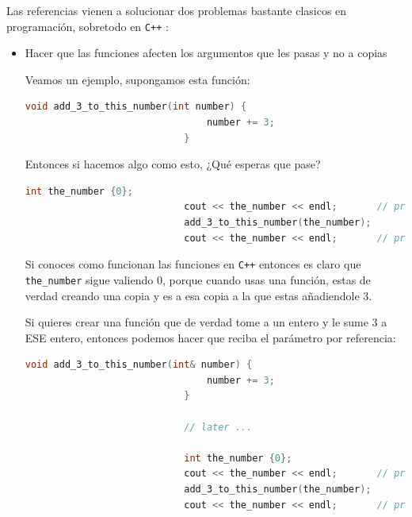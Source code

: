 \documentclass[12pt, fleqn]{report}                             %
\theoremstyle{break}                                            %
\newcommand{\textCode}[1]  { \texttt{#1} }                      %
\newcommand \Cpp  {\textCode{C++} }                               %
\begin{document}
                Las referencias vienen a solucionar dos problemas bastante clasicos en programación, 
                sobretodo en \Cpp:
                \begin{itemize}
                    \item Hacer que las funciones afecten los argumentos que les pasas y no a copias
                        
                        Veamos un ejemplo, supongamos esta función:
                        \begin{lstlisting}[language=C++, gobble=28]
                            void add_3_to_this_number(int number) {
                                number += 3;
                            }
                        \end{lstlisting}

                        Entonces si hacemos algo como esto, ¿Qué esperas que pase?
                        \begin{lstlisting}[language=C++, gobble=28]
                            int the_number {0};
                            cout << the_number << endl;       // prints 0
                            add_3_to_this_number(the_number);
                            cout << the_number << endl;       // prints 0 :c
                        \end{lstlisting}

                        Si conoces como funcionan las funciones en \Cpp entonces es claro que
                        \textCode{the\_number} sigue valiendo 0, porque cuando usas una función,
                        estas de verdad creando una copia y es a esa copia a la que estas añadiendole 3.

                        Si quieres crear una función que de verdad tome a un entero y le sume 3 a ESE entero,
                        entonces podemos hacer que reciba el parámetro por referencia:
                        \begin{lstlisting}[language=C++, gobble=28]
                            void add_3_to_this_number(int& number) {
                                number += 3;
                            }

                            // later ...
                            
                            int the_number {0};
                            cout << the_number << endl;       // prints 0
                            add_3_to_this_number(the_number);
                            cout << the_number << endl;       // prints 3 :)
                        \end{lstlisting}


\end{itemize}
\end{document}
